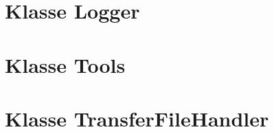\subsection{}

\newpage


\section{Klasse Logger}
\paragraph{}

\subsection{}

\newpage


\section{Klasse Tools}
\paragraph{}

\subsection{}

\newpage


\section{Klasse TransferFileHandler}
\paragraph{}

\subsection{}